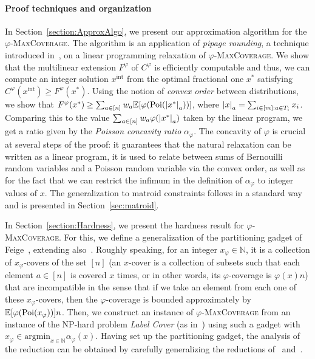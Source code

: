 \paragraph{Proof techniques and organization}
In Section~\ref{section:ApproxAlgo}, we present our approximation algorithm for the $\varphi$-\textsc{MaxCoverage}. The algorithm is an application of \emph{pipage rounding}, a technique introduced in~\cite{AS04}, on a linear programming relaxation of $\varphi$-\textsc{MaxCoverage}. We show that the multilinear extension $F^{\varphi}$ of $C^{\varphi}$ is efficiently computable and thus, we can compute an integer solution $x^{\text{int}}$ from the optimal fractional one $x^*$ satisfying $C^{\varphi}(x^{\text{int}}) \geq F^{\varphi}(x^*)$. Using the notion of \emph{convex order} between distributions, we show that $F^{\varphi}(x^*) \geq \sum_{a \in [n]} w_a \mathbb{E}[\varphi(\operatorname{\text{Poi}}(\abs{x^*}_a))]$, where $\abs{x}_{a} = \sum_{i \in [m] : a \in T_i} x_i$. Comparing this to the value $\sum_{a \in [n]} w_a \varphi(\abs{x^*}_a)$ taken by the linear program, we get a ratio given by the \emph{Poisson concavity ratio} $\alpha_{\varphi}$. The concavity of $\varphi$ is crucial at several steps of the proof: it guarantees that the natural relaxation can be written as a linear program, it is used to relate between sums of Bernouilli random variables and a Poisson random variable via the convex order, as well as for the fact that we can restrict the infimum in the definition of $\alpha_{\varphi}$ to integer values of $x$. The generalization to matroid constraints follows in a standard way and is presented in Section~\ref{sec:matroid}.

In Section~\ref{section:Hardness}, we present the hardness result for $\varphi$-\textsc{MaxCoverage}. For this, we define a generalization of the partitioning gadget of Feige~\cite{Feige98}, extending also~\cite{BFGG20}. Roughly speaking, for an integer $x_{\varphi} \in \mathbb{N}$, it is a collection of $x_{\varphi}$-covers  of the set $[n]$ (an $x$-cover is a collection of subsets such that each element $a \in [n]$ is covered $x$ times, or in other words, its $\varphi$-coverage is $\varphi(x)n$) that are incompatible in the sense that if we take an element from each one of these $x_{\varphi}$-covers, then the $\varphi$-coverage is bounded approximately by $\mathbb{E}[\varphi(\operatorname{\text{Poi}}(x_{\varphi}))] n$. Then, we construct an instance of $\varphi$-\textsc{MaxCoverage} from an instance of the \textrm{NP}-hard problem \emph{Label Cover} (as in~\cite{DMMS20}) using such a gadget with $x_{\varphi} \in \text{argmin}_{x \in \mathbb{N}} \alpha_{\varphi}(x)$. Having set up the partitioning gadget, the analysis of the reduction can be obtained by carefully generalizing the reductions of~\cite{BFGG20} and~\cite{DMMS20}.

